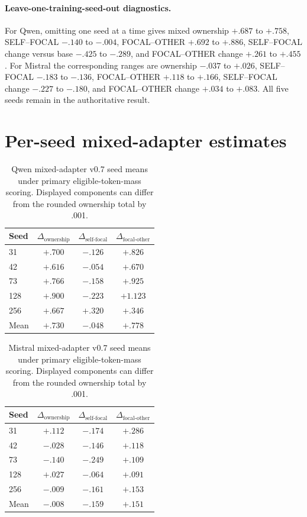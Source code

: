 \documentclass{article}
\begin{document}
\paragraph{Leave-one-training-seed-out diagnostics.}
For Qwen, omitting one seed at a time gives mixed ownership $+.687$ to $+.758$, SELF--FOCAL $-.140$ to $-.004$, FOCAL--OTHER $+.692$ to $+.886$, SELF--FOCAL change versus base $-.425$ to $-.289$, and FOCAL--OTHER change $+.261$ to $+.455$. For Mistral the corresponding ranges are ownership $-.037$ to $+.026$, SELF--FOCAL $-.183$ to $-.136$, FOCAL--OTHER $+.118$ to $+.166$, SELF--FOCAL change $-.227$ to $-.180$, and FOCAL--OTHER change $+.034$ to $+.083$. All five seeds remain in the authoritative result.

\section{Per-seed mixed-adapter estimates}
\begin{table}[h]
\caption{Qwen mixed-adapter v0.7 seed means under primary eligible-token-mass scoring. Displayed components can differ from the rounded ownership total by .001.}
\scriptsize
\begin{center}
\begin{tabular}{lccc}
\toprule
Seed & $\Delta_{\mathrm{ownership}}$ & $\Delta_{\mathrm{self\text{-}focal}}$ & $\Delta_{\mathrm{focal\text{-}other}}$ \\
\midrule
31 & $+.700$ & $-.126$ & $+.826$ \\
42 & $+.616$ & $-.054$ & $+.670$ \\
73 & $+.766$ & $-.158$ & $+.925$ \\
128 & $+.900$ & $-.223$ & $+1.123$ \\
256 & $+.667$ & $+.320$ & $+.346$ \\
\midrule
Mean & $+.730$ & $-.048$ & $+.778$ \\
\bottomrule
\end{tabular}
\end{center}
\end{table}

\begin{table}[h]
\caption{Mistral mixed-adapter v0.7 seed means under primary eligible-token-mass scoring. Displayed components can differ from the rounded ownership total by .001.}
\scriptsize
\begin{center}
\begin{tabular}{lccc}
\toprule
Seed & $\Delta_{\mathrm{ownership}}$ & $\Delta_{\mathrm{self\text{-}focal}}$ & $\Delta_{\mathrm{focal\text{-}other}}$ \\
\midrule
31 & $+.112$ & $-.174$ & $+.286$ \\
42 & $-.028$ & $-.146$ & $+.118$ \\
73 & $-.140$ & $-.249$ & $+.109$ \\
128 & $+.027$ & $-.064$ & $+.091$ \\
256 & $-.009$ & $-.161$ & $+.153$ \\
\midrule
Mean & $-.008$ & $-.159$ & $+.151$ \\
\bottomrule
\end{tabular}
\end{center}
\end{table}
\end{document}
